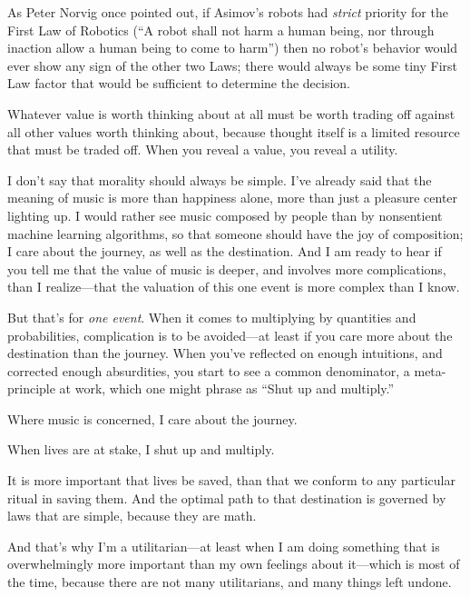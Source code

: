 {
 As Peter Norvig once pointed out, if Asimov's
robots had \textit{strict} priority for the First Law of Robotics
(``A robot shall not harm a human being, nor through
inaction allow a human being to come to harm'') then
no robot's behavior would ever show any sign of the
other two Laws; there would always be some tiny First Law factor that
would be sufficient to determine the decision.}

{
 Whatever value is worth thinking about at all must be worth
trading off against all other values worth thinking about, because
thought itself is a limited resource that must be traded off. When you
reveal a value, you reveal a utility.}

{
 I don't say that morality should always be simple.
I've already said that the meaning of music is more
than happiness alone, more than just a pleasure center lighting up. I
would rather see music composed by people than by nonsentient machine
learning algorithms, so that someone should have the joy of
composition; I care about the journey, as well as the destination. And
I am ready to hear if you tell me that the value of music is deeper,
and involves more complications, than I realize---that the valuation of
this one event is more complex than I know.}

{
 But that's for \textit{one event}. When it comes
to multiplying by quantities and probabilities, complication is to be
avoided---at least if you care more about the destination than the
journey. When you've reflected on enough intuitions,
and corrected enough absurdities, you start to see a common
denominator, a meta-principle at work, which one might phrase as
``Shut up and multiply.''}

{
 Where music is concerned, I care about the journey.}

{
 When lives are at stake, I shut up and multiply.}

{
 It is more important that lives be saved, than that we conform to
any particular ritual in saving them. And the optimal path to that
destination is governed by laws that are simple, because they are
math.}

{
 And that's why I'm a
utilitarian---at least when I am doing something that is overwhelmingly
more important than my own feelings about it---which is most of the
time, because there are not many utilitarians, and many things left
undone.}

\myendsectiontext


\bigskip


